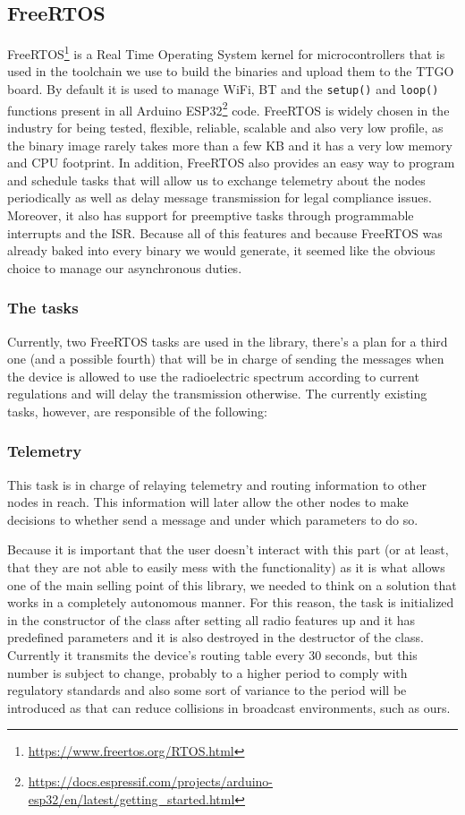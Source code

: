\subsection{FreeRTOS}
FreeRTOS\footnote{\url{https://www.freertos.org/RTOS.html}} is a Real Time Operating System kernel for microcontrollers that is used in the toolchain we use to build the binaries and upload them to the TTGO board. By default it is used to manage WiFi, BT and the \texttt{setup()} and \texttt{loop()} functions present in all Arduino ESP32\footnote{\url{https://docs.espressif.com/projects/arduino-esp32/en/latest/getting_started.html}} code. FreeRTOS is widely chosen in the industry for being tested, flexible, reliable, scalable and also very low profile, as the binary image rarely takes more than a few KB and it has a very low memory and CPU footprint\cite{FreeRTOSCharacteristics}. In addition, FreeRTOS also provides an easy way to program and schedule tasks that will allow us to exchange telemetry about the nodes periodically as well as delay message transmission for legal compliance issues. Moreover, it also has support for preemptive tasks through programmable interrupts and the ISR.
Because all of this features and because FreeRTOS was already baked into every binary we would generate, it seemed like the obvious choice to manage our asynchronous duties.
\subsubsection{The tasks}
Currently, two FreeRTOS tasks are used in the library, there's a plan for a third one (and a possible fourth) that will be in charge of sending the messages when the device is allowed to use the radioelectric spectrum according to current regulations and will delay the transmission otherwise. The currently existing tasks, however, are responsible of the following:
\subsubsection*{Telemetry}
This task is in charge of relaying telemetry and routing information to other nodes in reach. This information will later allow the other nodes to make decisions to whether send a message and under which parameters to do so.

Because it is important that the user doesn't interact with this part (or at least, that they are not able to easily mess with the functionality) as it is what allows one of the main selling point of this library, we needed to think on a solution that works in a completely autonomous manner. For this reason, the task is initialized in the constructor of the class after setting all radio features up and it has predefined parameters and it is also destroyed in the destructor of the class. Currently it transmits the device's routing table every 30 seconds, but this number is subject to change, probably to a higher period to comply with regulatory standards and also some sort of variance to the period will be introduced as that can reduce collisions\cite{Floyd1994} in broadcast environments, such as ours.


